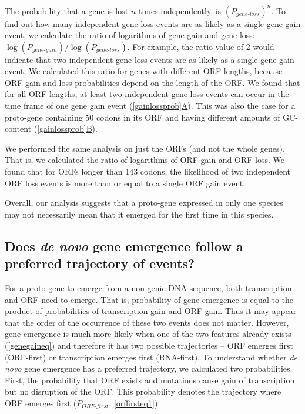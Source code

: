 \documentclass[12pt,a4paper]{article}
\begin{document}
The probability that a gene is lost $n$ times independently, is $(P_\textit{gene-loss})^{n}$. To find out how many independent gene loss events are as likely as a single gene gain event, we calculate the ratio of logarithms of gene gain and gene loss: $\log(P_\textit{gene-gain})/\log(P_\textit{gene-loss})$. For example, the ratio value of 2 would indicate that two independent gene loss events are as likely as a single gene gain event. We calculated this ratio for genes with different ORF lengths, because ORF gain and loss probabilities depend on the length of the ORF. We found that for all ORF lengths, at least two independent gene loss events can occur in the time frame of one gene gain event (\hyperref[gainlossprob]{\autoref{gainlossprob}A}). This was also the case for a proto-gene containing 50 codons in its ORF and having different amounts of GC-content (\hyperref[gainlossprob]{\autoref{gainlossprob}B}).

We performed the same analysis on just the ORFs (and not the whole genes). That is, we calculated the ratio of logarithms of ORF gain and ORF loss. We found that for ORFs longer than 143 codons, the likelihood of two independent ORF loss events is more than or equal to a single ORF gain event. 

Overall, our analysis suggests that a proto-gene expressed in only one species may not necessarily mean that it emerged for the first time in this species. 

\subsection{Does \textit{de novo} gene emergence follow a preferred trajectory of events?}

For a proto-gene to emerge from a non-genic DNA sequence, both transcription and ORF need to emerge. That is, probability of gene emergence is equal to the product of probabilities of transcription gain and ORF gain. Thus it may appear that the order of the occurrence of these two events does not matter. However, gene emergence is much more likely when one of the two features already exists (\autoref{genegaineq}) and therefore it has two possible trajectories -- ORF emerges first (ORF-first) or transcription emerges first (RNA-first). To understand whether \textit{de novo} gene emergence has a preferred trajectory, we calculated two probabilities. First, the probability that ORF exists and  mutations cause gain of transcription but no disruption of the ORF. This probability denotes the trajectory where ORF emerges first ($P_\textit{ORF-first}$, \autoref{orffirsteq1}). 
\end{document}
